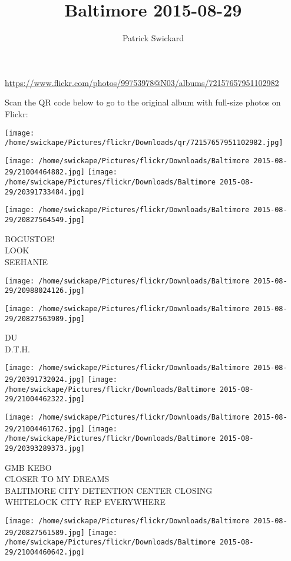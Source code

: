 \documentclass[10pt,letterpaper]{article}
\title{Baltimore 2015-08-29}
\author{Patrick Swickard}
\date{}
\begin{document}
\maketitle

\url{https://www.flickr.com/photos/99753978@N03/albums/72157657951102982}

Scan the QR code below to go to the original album with full-size photos on Flickr:

\texttt{[image: /home/swickape/Pictures/flickr/Downloads/qr/72157657951102982.jpg]}
\pagebreak

\texttt{[image: /home/swickape/Pictures/flickr/Downloads/Baltimore 2015-08-29/21004464882.jpg]}
\texttt{[image: /home/swickape/Pictures/flickr/Downloads/Baltimore 2015-08-29/20391733484.jpg]}

\vspace{0.25in}
\texttt{[image: /home/swickape/Pictures/flickr/Downloads/Baltimore 2015-08-29/20827564549.jpg]}

BOGUSTOE!\\
LOOK\\
SEEHANIE
\pagebreak

\texttt{[image: /home/swickape/Pictures/flickr/Downloads/Baltimore 2015-08-29/20988024126.jpg]}

\vspace{0.25in}
\texttt{[image: /home/swickape/Pictures/flickr/Downloads/Baltimore 2015-08-29/20827563989.jpg]}

DU\\
D.T.H.
\pagebreak

\texttt{[image: /home/swickape/Pictures/flickr/Downloads/Baltimore 2015-08-29/20391732024.jpg]}
\texttt{[image: /home/swickape/Pictures/flickr/Downloads/Baltimore 2015-08-29/21004462322.jpg]}

\texttt{[image: /home/swickape/Pictures/flickr/Downloads/Baltimore 2015-08-29/21004461762.jpg]}
\texttt{[image: /home/swickape/Pictures/flickr/Downloads/Baltimore 2015-08-29/20393289373.jpg]}

GMB KEBO\\
CLOSER TO MY DREAMS\\
BALTIMORE CITY DETENTION CENTER CLOSING\\
WHITELOCK CITY REP EVERYWHERE
\pagebreak

\texttt{[image: /home/swickape/Pictures/flickr/Downloads/Baltimore 2015-08-29/20827561589.jpg]}
\texttt{[image: /home/swickape/Pictures/flickr/Downloads/Baltimore 2015-08-29/21004460642.jpg]}
\end{document}
